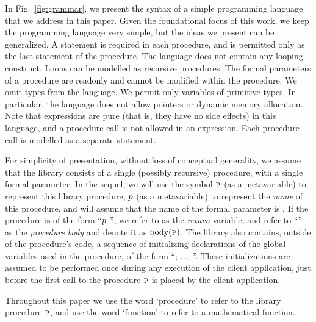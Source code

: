 In Fig.~\ref{fig:grammar}, we present the syntax of a simple
programming language that we address in this paper.
Given the foundational focus of this work, we keep the programming
language very simple, but the ideas we present can be generalized.
A  statement is required in each procedure,
and is permitted only as the last
statement of the procedure.
The language does not contain any looping construct.
Loops can be modelled as recursive procedures.
The formal parameters of a procedure are readonly and cannot be
modified within the procedure.
We omit types from the language. We permit only variables of primitive types.
In particular, the language does not allow pointers or dynamic memory allocation.
Note that expressions are pure (that is, they have no side effects) in this language, and a procedure call
is not allowed in an expression. Each procedure call is modelled as a
separate statement.

For simplicity of presentation, without loss of conceptual generality, we assume
that the library consists of a single (possibly recursive) procedure, with a single formal
parameter.
In the sequel, we will use the symbol $\textsc{p}$ (as a metavariable) to
represent this library procedure, $p$ (as a metavariable) to
represent the \emph{name} of this procedure, and will assume that the name
of the formal parameter is . 
If the procedure is of the form ``$p$ '', we refer to  as the \emph{return}
variable, and  refer to ``'' as the \emph{procedure body}
and denote it as $\text{body}(\textsc{p})$.
The library also contains, outside of the procedure's code,
a sequence of initializing declarations of
the global variables used in the procedure, of the form ``;
$\ldots$; ''. These initializations are assumed to be
performed  once during any execution of the client application,
just before the first call to the
procedure $\textsc{p}$ is placed by the client application.

Throughout this paper we
 use the word `procedure' to refer to the library procedure $\textsc{p}$, and
 use the word
`function' to refer to a mathematical function.
